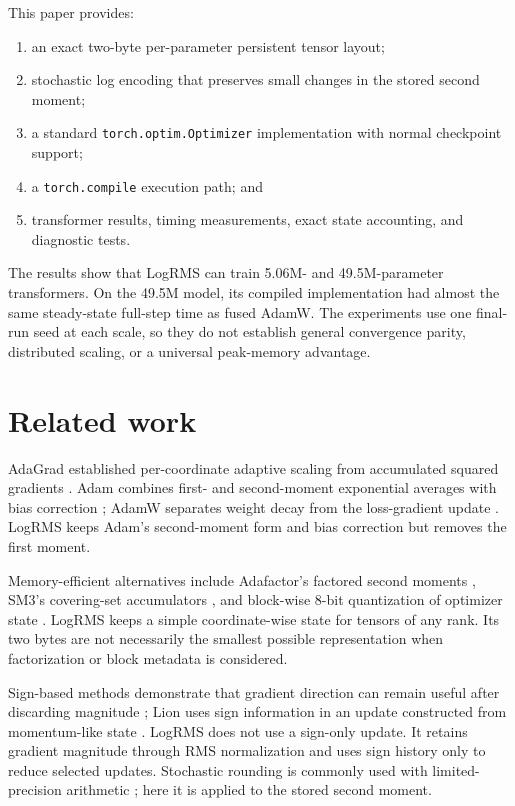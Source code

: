\documentclass[10pt,twocolumn]{article}
\begin{document}
This paper provides:

\begin{enumerate}
  \item an exact two-byte per-parameter persistent tensor layout;
  \item stochastic log encoding that preserves small changes in the stored
        second moment;
  \item a standard \texttt{torch.optim.Optimizer} implementation with normal
        checkpoint support;
  \item a \texttt{torch.compile} execution path; and
  \item transformer results, timing measurements, exact state accounting, and
        diagnostic tests.
\end{enumerate}

The results show that LogRMS can train 5.06M- and 49.5M-parameter transformers.
On the 49.5M model, its compiled implementation had almost the same steady-state
full-step time as fused AdamW. The experiments use one final-run seed at each
scale, so they do not establish general convergence parity, distributed
scaling, or a universal peak-memory advantage.

\section{Related work}

AdaGrad established per-coordinate adaptive scaling from accumulated squared
gradients \cite{duchi2011adaptive}. Adam combines first- and second-moment
exponential averages with bias correction \cite{kingma2014adam}; AdamW separates
weight decay from the loss-gradient update \cite{loshchilov2017decoupled}.
LogRMS keeps Adam's second-moment form and bias correction but removes the first
moment.

Memory-efficient alternatives include Adafactor's factored second moments
\cite{shazeer2018adafactor}, SM3's covering-set accumulators
\cite{anil2019sm3}, and block-wise 8-bit quantization of optimizer state
\cite{dettmers20218bit}. LogRMS keeps a simple coordinate-wise state for tensors
of any rank. Its two bytes are not necessarily the smallest possible
representation when factorization or block metadata is considered.

Sign-based methods demonstrate that gradient direction can remain useful after
discarding magnitude \cite{bernstein2018signsgd}; Lion uses sign information in
an update constructed from momentum-like state \cite{chen2023lion}. LogRMS does
not use a sign-only update. It retains gradient magnitude through RMS
normalization and uses sign history only to reduce selected updates. Stochastic
rounding is commonly used with limited-precision arithmetic
\cite{gupta2015limited}; here it is applied to the stored second moment.
\end{document}
